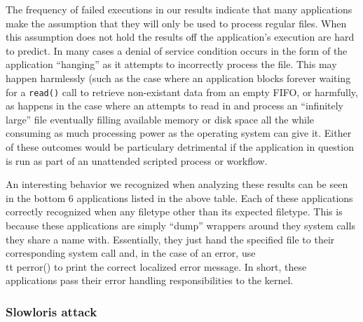 The frequency of failed executions in our results indicate that many
applications make the assumption that they will only be used to process
regular files.  When this assumption does not hold the results off the
application's execution are hard to predict.  In many cases a denial of
service condition occurs in the form of the application ``hanging'' as it
attempts to incorrectly process the file.  This may happen harmlessly (such
as the case where an application blocks forever waiting for a {\tt read()}
call to retrieve non-existant data from an empty FIFO, or harmfully, as
happens in the case where an attempts to read in and process an
``infinitely large'' file eventually filling available memory or disk
space all the while consuming as much processing power as the operating
system can give it.  Either of these outcomes would be particulary
detrimental if the application in question is run as part of an unattended
scripted process or workflow.

An interesting behavior we recognized when analyzing these results can be
seen in the bottom 6 applications listed in the above table.  Each of these
applications correctly recognized when any filetype other than its expected
filetype.  This is because these applications are simply ``dump'' wrappers
around they system calls they share a name with.  Essentially, they just
hand the specified file to their corresponding system call and, in the case
of an error, use {\\tt perror()} to print the correct localized error
message.  In short, these applications pass their error handling
responsibilities to the kernel.

\subsubsection{Slowloris attack}




